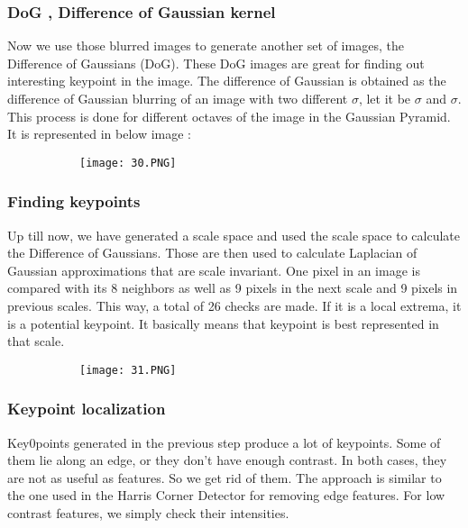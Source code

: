 \documentclass{article}
\begin{document}
\subsubsection{DoG , Difference of Gaussian kernel}

Now we use those blurred images to generate another set of images, the Difference of Gaussians (DoG). These DoG images are great for finding out interesting keypoint in the image. The difference of Gaussian is obtained as the difference of Gaussian blurring of an image with two different $\sigma$, let it be $\sigma$ and $\sigma$. This process is done for different octaves of the image in the Gaussian Pyramid. It is represented in below image : 

\begin{figure}[ht!]
  \centering
  \begin{subfigure}[b]{0.6\linewidth}
    \texttt{[image: 30.PNG]}
  \end{subfigure}
\end{figure}

\subsubsection{Finding keypoints}

Up till now, we have generated a scale space and used the scale space to calculate the Difference of Gaussians. Those are then used to calculate Laplacian of Gaussian approximations that are scale invariant.
One pixel in an image is compared with its 8 neighbors as well as 9 pixels in the next scale and 9 pixels in previous scales. This way, a total of 26 checks are made. If it is a local extrema, it is a potential keypoint. It basically means that keypoint is best represented in that scale.

\begin{figure}[ht!]
  \centering
  \begin{subfigure}[b]{0.3\linewidth}
    \texttt{[image: 31.PNG]}
  \end{subfigure}
\end{figure}

\subsubsection{Keypoint localization}

Key0points generated in the previous step produce a lot of keypoints. Some of them lie along an edge, or they don’t have enough contrast. In both cases, they are not as useful as features. So we get rid of them. The approach is similar to the one used in the Harris Corner Detector for removing edge features. For low contrast features, we simply check their intensities.
\end{document}
